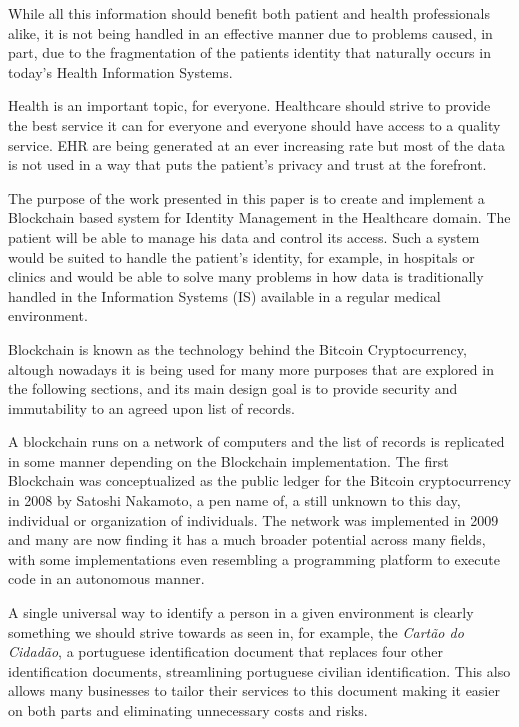\documentclass[]{llncs}
\begin{document}
While all this information should benefit both patient and health professionals alike, it is not being handled in an 
effective manner due to problems caused, in part, due to the fragmentation of the patients identity that 
naturally occurs in today's Health Information Systems.

Health is an important topic, for everyone. Healthcare should strive to provide the best service it can for everyone 
and everyone should have access to a quality service. EHR are being generated at an ever increasing rate but most of 
the data is not used in a way that puts the patient's privacy and trust at the forefront.

The purpose of the work presented in this paper is to create and implement a Blockchain based system for Identity Management 
in the Healthcare domain. The patient will be able to manage his data and control its access. Such a system would be suited 
to handle the patient’s identity, for example, in hospitals or clinics and would be able to solve many problems in how data 
is traditionally handled in the Information Systems (IS) available in a regular medical environment.

Blockchain is known as the technology behind the Bitcoin Cryptocurrency, altough nowadays it is being used for many more 
purposes that are explored in the following sections, and its main design goal is to provide security and immutability to 
an agreed upon list of records.

A blockchain runs on a network of computers and the list of records is replicated in some manner depending on the Blockchain 
implementation. The first Blockchain was conceptualized as the public ledger for the Bitcoin cryptocurrency in 2008 by 
Satoshi Nakamoto, a pen name of, a still unknown to this day, individual or organization of individuals. 
The network was implemented in 2009 and many are now finding it has a much broader potential across many fields, 
with some implementations even resembling a programming platform to execute code in an autonomous manner.
\cite{Nakamoto2008}

A single universal way to identify a person in a given environment is clearly something we should strive towards as seen in, 
for example, the \textit{Cartão do Cidadão}, a portuguese identification document that replaces four other identification documents, 
streamlining portuguese civilian identification. 
This also allows many businesses to tailor their services to this document making it easier on both parts and eliminating 
unnecessary costs and risks.
\end{document}
